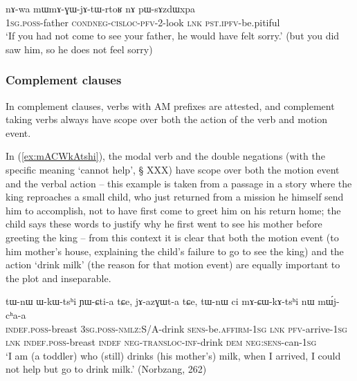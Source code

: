 \begin{exe}
\ex \label{ex:mWmAGWjAtWrtoR}
\gll nɤ-wa  mɯ\redp{}mɤ-ɣɯ-jɤ-tɯ-rtoʁ nɤ pɯ-sɤzdɯxpa \\
\textsc{1sg.poss}-father \textsc{cond}\redp{}\textsc{neg}-\textsc{cisloc}-\textsc{pfv}-2-look \textsc{lnk} \textsc{pst.ipfv}-be.pitiful \\ 
\glt `If you had not come to see your father, he would have felt sorry.' (but you did saw him, so he does not feel sorry)
\end{exe}

\subsubsection{Complement clauses} \label{sec:am.complement}
In complement clauses, verbs with AM prefixes are attested, and complement taking verbs always have scope over both the action of the verb and motion event.

 
In (\ref{ex:mACWkAtshi}), the modal verb  and the double negations (with the specific meaning `cannot help', § XXX) have scope over both the motion event and the verbal action -- this example is taken from a passage in a story where the king reproaches a small child, who just returned from a mission he himself send him to accomplish, not to have first come to greet him on his return home; the child says these words to justify why he first went to see his mother before greeting the king -- from this context it is clear that both the motion event (to him mother's house, explaining the child's failure to go to see the king) and the action `drink milk' (the reason for that motion event) are equally important to the plot and inseparable. 

\begin{exe}
\ex \label{ex:mACWkAtshi}
\gll  tɯ-nɯ ɯ-kɯ-tsʰi ɲɯ-ɕti-a tɕe, jɤ-azɣɯt-a tɕe, tɯ-nɯ ci mɤ-ɕɯ-kɤ-tsʰi nɯ mɯ́j-cʰa-a \\
\textsc{indef}.\textsc{poss}-breast \textsc{3sg}.\textsc{poss}-\textsc{nmlz}:S/A-drink \textsc{sens}-be.\textsc{affirm}-\textsc{1sg} \textsc{lnk} \textsc{pfv}-arrive-\textsc{1sg} \textsc{lnk} \textsc{indef}.\textsc{poss}-breast  \textsc{indef} \textsc{neg}-\textsc{transloc}-\textsc{inf}-drink \textsc{dem} \textsc{neg}:\textsc{sens}-can-\textsc{1sg} \\
\glt `I am (a toddler) who (still) drinks (his mother's) milk, when I arrived, I could not help but go to drink milk.'  (Norbzang, 262)
 \end{exe}
 
